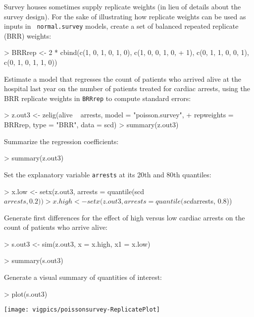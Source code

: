 \begin{enumerate}
Survey houses sometimes supply
replicate weights (in lieu of details about the survey design).  For the sake
of illustrating how replicate weights can be used as inputs in {\tt
normal.survey} models, create a set of balanced repeated replicate
(BRR) weights: 
\begin{Schunk}
\begin{Sinput}
> BRRrep <- 2 * cbind(c(1, 0, 1, 0, 1, 0), c(1, 0, 0, 1, 0, 
+     1), c(0, 1, 1, 0, 0, 1), c(0, 1, 0, 1, 1, 0))
\end{Sinput}
\end{Schunk}
Estimate a model that regresses the count of patients who arrived alive at
the hospital last year on the number of patients treated for cardiac arrests, using
the BRR replicate weights in {\tt BRRrep} to compute standard errors:
\begin{Schunk}
\begin{Sinput}
> z.out3 <- zelig(alive ~ arrests, model = "poisson.survey", 
+     repweights = BRRrep, type = "BRR", data = scd)
> summary(z.out3)
\end{Sinput}
\end{Schunk}
Summarize the regression coefficients: 
\begin{Schunk}
\begin{Sinput}
> summary(z.out3)
\end{Sinput}
\end{Schunk}
Set the explanatory variable {\tt arrests} at its 20th and 80th quantiles:
\begin{Schunk}
\begin{Sinput}
> x.low <- setx(z.out3, arrests = quantile(scd$arrests, 0.2))
> x.high <- setx(z.out3, arrests = quantile(scd$arrests, 0.8))
\end{Sinput}
\end{Schunk}
Generate first
differences for the effect of high versus low cardiac arrests
on the count of patients who arrive alive:
\begin{Schunk}
\begin{Sinput}
> s.out3 <- sim(z.out3, x = x.high, x1 = x.low)
\end{Sinput}
\end{Schunk}
\begin{Schunk}
\begin{Sinput}
> summary(s.out3)
\end{Sinput}
\end{Schunk}
Generate a visual summary of quantities of interest:
\begin{center}
\begin{Schunk}
\begin{Sinput}
> plot(s.out3)
\end{Sinput}
\end{Schunk}
\texttt{[image: vigpics/poissonsurvey-ReplicatePlot]}
\end{center}


\end{enumerate}

